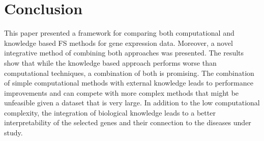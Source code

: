 \chapter{Conclusion}
\label{chapter:conclusion}

This paper presented a framework for comparing both computational and knowledge based FS methods for gene expression data. 
Moreover, a novel integrative method of combining both approaches was presented. 
The results show that while the knowledge based approach performs worse than computational techniques, a combination of both is promising. 
The combination of simple computational methods with external knowledge leads to performance improvements and can compete with more complex methods that might be unfeasible given a dataset that is very large. 
In addition to the low computational complexity, the integration of biological knowledge leads to a better interpretability of the selected genes and their connection to the diseases under study. 

